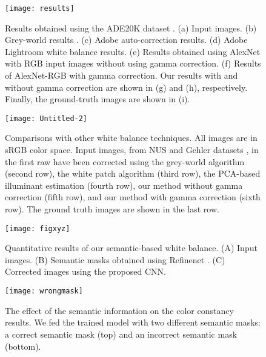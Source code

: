 \documentclass[sigplan]{acmart}
\begin{document}
\begin{figure*}
  \texttt{[image: results]}
  \caption{Results obtained using the ADE20K dataset \cite{ade20k}. (a) Input images. (b) Grey-world results \cite{buchsbaum1980spatial}. (c) Adobe auto-correction results. (d) Adobe Lightroom white balance results. (e) Results obtained using AlexNet \cite{alex} with RGB input images without using gamma correction. (f) Results of AlexNet-RGB with gamma correction. Our results with and without gamma correction are shown in (g) and (h), respectively. Finally, the ground-truth images are shown in (i). }
  \label{fig2}
\end{figure*}


\begin{figure*}
  \texttt{[image: Untitled-2]}
  \caption{Comparisons with other white balance techniques. All images are in sRGB color space. Input images, from NUS and Gehler datasets \cite{nus,gehler2008bayesian}, in the first raw have been corrected using the grey-world algorithm \cite{buchsbaum1980spatial} (second row), the white patch algorithm \cite{brainard1986analysis} (third row), the PCA-based illuminant estimation \cite{nus} (fourth row), our method without gamma correction (fifth row), and our method with gamma correction (sixth row). The ground truth images are shown in the last row. }
  \label{fig2_2}
\end{figure*}



\begin{figure}
  \texttt{[image: figxyz]}
  \caption{Quantitative results of our semantic-based white balance. (A) Input images. (B) Semantic masks obtained using Refinenet \cite{refnet}. (C) Corrected images using the proposed CNN.}
  \label{figxyz}
\end{figure}




\begin{figure}
  \texttt{[image: wrongmask]}
  \caption{The effect of the semantic information on the color constancy results. We fed the trained model with two different semantic masks: a correct semantic mask (top) and an incorrect semantic mask (bottom).}
  \label{fig3}
\end{figure}
\end{document}
